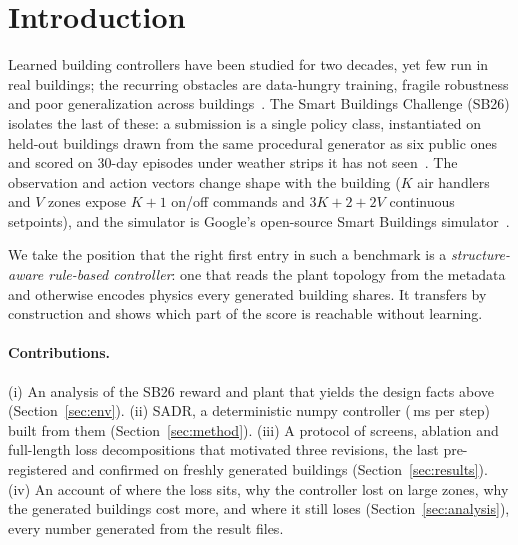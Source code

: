 \documentclass{article}
\begin{document}
\begin{abstract}
buildings' size range and by \RFConfPubRed{} on the public set. On Kaggle's hidden scenarios v7
scores \RFiveKagVSeven, \RFiveKagGapPub{} times its public value; submissions of fixed earlier versions
and of the organizers' baseline show that the hidden buildings behave like the public ones and point to
harsher weather: the public scenarios plus the kit's unused Minneapolis station reproduce the probes'
ratios to v7. A fifth round adds a deeper weekend setback and lifts a request cap that bound in deep cold:
v8 lowers the loss by \RFiveConfPubRelAbs{} on the public set and \RFiveConfPubMinnRelAbs{} with Minneapolis
added (Kaggle: \RFiveKagVEight). We release the controller and report where it still loses.
\end{abstract}

\section{Introduction}

Learned building controllers have been studied for two decades, yet few run in real
buildings; the recurring obstacles are data-hungry training, fragile robustness and poor
generalization across buildings~\citep{wang2020rl}. The Smart Buildings Challenge (SB26)
isolates the last of these: a submission is a single policy class, instantiated on held-out
buildings drawn from the same procedural generator as six public ones and scored on 30-day
episodes under weather strips it has not seen~\citep{sb26kit}. The observation and action
vectors change shape with the building ($K$ air handlers and $V$ zones expose $K{+}1$ on/off
commands and $3K{+}2{+}2V$ continuous setpoints), and the simulator is Google's open-source
Smart Buildings simulator~\citep{goldfeder2023lightweight,goldfeder2025suite}.

We take the position that the right first entry in such a benchmark is a
\emph{structure-aware rule-based controller}: one that reads the plant topology from the
metadata and otherwise encodes physics every generated building shares. It transfers by
construction and shows which part of the score is reachable without learning.

\paragraph{Contributions.}
(i) An analysis of the SB26 reward and plant that yields the design facts above
(Section~\ref{sec:env}). (ii) SADR, a deterministic numpy controller (\PolicyMsOurs{}\,ms per
step) built from them (Section~\ref{sec:method}). (iii) A protocol of screens, ablation and
full-length loss decompositions that motivated three revisions, the last pre-registered and
confirmed on \RFFreshNBuild{} freshly generated buildings (Section~\ref{sec:results}). (iv) An
account of where the loss sits, why the controller lost on large zones, why the generated
buildings cost more, and where it still loses (Section~\ref{sec:analysis}), every number
generated from the result files.
\end{document}
